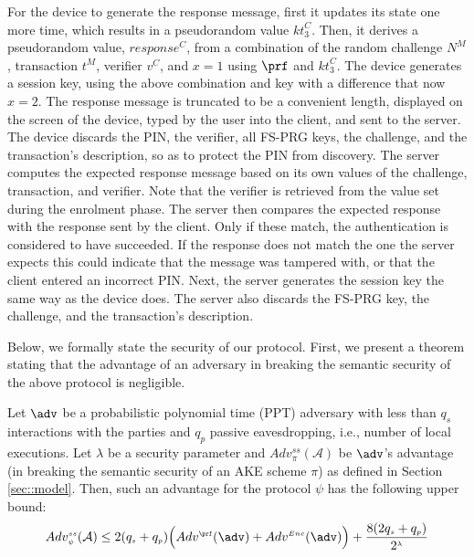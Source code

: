 \documentclass[runningheads]{llncs}
\newcommand{\sss}{\scriptscriptstyle}
\newcommand{\nonce}{\ensuremath{{N}}}
\newcommand{\keyt}{\ensuremath{{kt}}}
\newcommand{\trans}{\ensuremath{{t}}}
\renewcommand{\verifier}{\ensuremath{{v}}}
\newcommand{\VC}[1]{\ensuremath{#1^{\sss C}}}
\newcommand{\VM}[1]{\ensuremath{#1^{\sss M}}}
\newcommand{\A}{\mathcal{A}}
\begin{document}
For the device to generate the response message, first it updates its state one more time, which results in a pseudorandom value \VC{\keyt_{\sss 3}}. Then, it derives a pseudorandom value, \VC{\mathit{response}}, from a combination of the random challenge \VM{\nonce}, transaction \VM{\trans}, verifier \VC{\verifier}, and $x=1$  using $\prf$ and \VC{\keyt_{\sss 3}}. The device generates a session key, using the above combination and key with a difference that now $x=2$. The response message is truncated to be a convenient length, displayed on the screen of the device, typed by the user into the client, and sent to the server. The device discards the PIN, the verifier, all FS-PRG keys, the challenge, and the transaction's description, so as to protect the PIN from discovery. The server computes the expected response message based on its own values of the challenge, transaction, and verifier. Note that the verifier is retrieved from the value set during the enrolment phase. The server then compares the expected response with the response sent by the client. Only if these match, the authentication is considered to have succeeded. If the response does not match the one the server expects this could indicate that the message was tampered with, or that the client entered an incorrect PIN. Next, the server generates the session key the same way as the device does.  The server also discards the FS-PRG key, the challenge, and the transaction's description.

%
Below, we formally state the security of our protocol.  First, we present a theorem stating that the advantage of an adversary in breaking the semantic security of the above protocol is negligible.  
\begin{theorem}[Semantic Security]
Let $\adv$ be a probabilistic polynomial time (PPT) adversary with less than $q_{\sss s}$ interactions with the parties and $q_{\sss p}$ passive eavesdropping, i.e., number of local executions. Let $\lambda$ be a security parameter and $Adv_{\sss\pi}^{\sss ss}(\A)$ be  $\adv$'s advantage (in breaking the semantic security of an AKE scheme $\pi$) as defined in Section \ref{sec::model}. Then, such an advantage for the protocol $\psi$ has the following upper bound:  
%
\vspace{-3mm}
\begin{equation*} 
Adv_{\sss \psi}^{\sss ss}(\A) \leq 2(q_{\sss s}+q_{\sss p})\Big(Adv^{\sss\prf}(\adv)+Adv^{\sss Enc}(\adv)\Big)+\frac{8(2q_{\sss s}+q_{\sss p})}{2^{\sss\lambda}}
\end{equation*}
%
\end{theorem}
\end{document}
